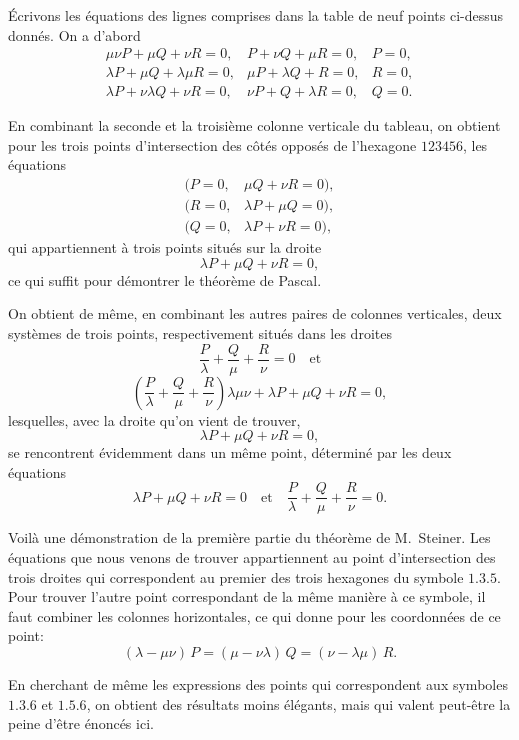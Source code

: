 \documentclass[12pt,a4paper]{article}
\theoremstyle{plain}
\begin{document}
\'Ecrivons les \'equations des lignes comprises dans la table de neuf points ci-dessus donn\'es. On a d'abord
\[
\begin{array}{lll}
\mu\nu P + \mu Q + \nu R = 0, & P + \nu Q + \mu R = 0, & P = 0, \\
\lambda P + \mu Q + \lambda\mu R = 0, & \mu P + \lambda Q + R = 0, & R = 0, \\
\lambda P + \nu\lambda Q + \nu R = 0, & \nu P + Q + \lambda R = 0, & Q = 0.
\end{array}
\]

En combinant la seconde et la troisi\`eme colonne verticale du tableau, on obtient pour les trois points d'intersection des c\^ot\'es oppos\'es de l'hexagone $123456$, les \'equations
\[
\begin{array}{ll}
( P = 0, & \mu Q + \nu R = 0 ), \\
( R = 0, & \lambda P + \mu Q = 0 ), \\
( Q = 0, & \lambda P + \nu R = 0 ),
\end{array}
\]
qui appartiennent \`a trois points situ\'es sur la droite
\[
\lambda P + \mu Q + \nu R = 0,
\]
ce qui suffit pour d\'emontrer le th\'eor\`eme de Pascal.

On obtient de m\^eme, en combinant les autres paires de colonnes verticales, deux syst\`emes de trois points, respectivement situ\'es dans les droites
\[
\frac{P}{\lambda} + \frac{Q}{\mu} + \frac{R}{\nu} = 0 \quad \text{et}
\]
\[
\left(\frac{P}{\lambda} + \frac{Q}{\mu} + \frac{R}{\nu}\right) \lambda\mu\nu + \lambda P + \mu Q + \nu R = 0,
\]
lesquelles, avec la droite qu'on vient de trouver,
\[
\lambda P + \mu Q + \nu R = 0,
\]
se rencontrent \'evidemment dans un m\^eme point, d\'etermin\'e par les deux \'equations
\[
\lambda P + \mu Q + \nu R = 0 \quad \text{et} \quad \frac{P}{\lambda} + \frac{Q}{\mu} + \frac{R}{\nu} = 0.
\]

Voil\`a une d\'emonstration de la premi\`ere partie du th\'eor\`eme de M.~Steiner. Les \'equations que nous venons de trouver appartiennent au point d'intersection des trois droites qui correspondent au premier des trois hexagones du symbole $1.3.5$. Pour trouver l'autre point correspondant de la m\^eme mani\`ere \`a ce symbole, il faut combiner les colonnes horizontales, ce qui donne pour les coordonn\'ees de ce point:
\[
(\lambda - \mu\nu)\, P = (\mu - \nu\lambda)\, Q = (\nu - \lambda\mu)\, R.
\]

En cherchant de m\^eme les expressions des points qui correspondent aux symboles $1.3.6$ et $1.5.6$, on obtient des r\'esultats moins \'el\'egants, mais qui valent peut-\^etre la peine d'\^etre \'enonc\'es ici.
\end{document}
